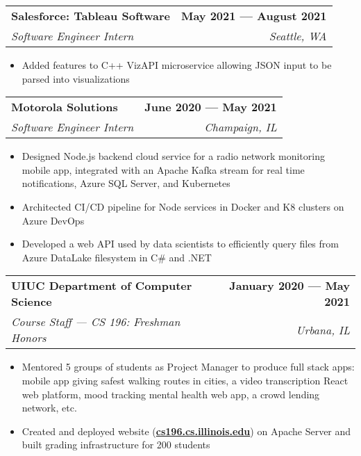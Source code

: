 \documentclass[letterpaper,11pt]{article}
\makeatletter
\newcommand{\resumeItem}[1]{
  \item\small{
    {#1 \vspace{-1pt}}
  }
}
\newcommand{\resumeSubheading}[4]{
  \vspace{-0pt}
  \item
    \begin{tabular*}{1\textwidth}[t]{l@{\extracolsep{\fill}}r}
      \large{\textbf{#1}} & \small{\color{main}\textbf{#2}} \\
      \textit{\small#3} & \textit{\small#4} \\
    \end{tabular*}\vspace{-7pt}
}
\newcommand{\resumeSubSubheading}[2]{
    \item
    \begin{tabular*}{0.97\textwidth}{l@{\extracolsep{\fill}}r}
      \textit{\small#1} & \textit{\small #2} \\
    \end{tabular*}\vspace{-7pt}
}
\newcommand{\resumeSubHeadingListEnd}{\end{itemize}}
\newcommand{\resumeItemListStart}{\begin{itemize}}
\newcommand{\resumeItemListEnd}{\end{itemize}\vspace{0pt}}
\makeatother
\begin{document}
    \resumeSubheading
      {Salesforce: Tableau Software} %
      {May 2021 --- August 2021} %
      {Software Engineer Intern} %
      {Seattle, WA} %
      \resumeItemListStart
        \resumeItem{Added features to C++ VizAPI microservice allowing JSON input to be parsed into visualizations}
      \resumeItemListEnd
      

    \resumeSubheading
      {Motorola Solutions} %
      {June 2020 --- May 2021} %
      {Software Engineer Intern} %
      {Champaign, IL} %
      \resumeItemListStart
        \resumeItem{Designed Node.js backend cloud service for a radio network monitoring mobile app, integrated with an Apache Kafka stream for real time notifications, Azure SQL Server, and Kubernetes }
        \resumeItem{Architected CI/CD pipeline for Node services in Docker and K8 clusters on Azure DevOps}
        \resumeItem{Developed a web API used by data scientists to efficiently query files from Azure DataLake filesystem in C\# and .NET}
    \resumeItemListEnd

    \resumeSubheading
      {UIUC Department of Computer Science} %
      {January 2020 --- May 2021} %
      {Course Staff --- CS 196: Freshman Honors} %
      {Urbana, IL} %
      \resumeItemListStart
        \resumeItem{Mentored 5 groups of students as Project Manager to produce full stack apps: mobile app giving safest walking routes in cities, a video transcription React web platform, mood tracking mental health web app, a crowd lending network, etc. }
        \resumeItem{Created and deployed website (\textbf{\href{https://cs196.cs.illinois.edu}{cs196.cs.illinois.edu}}) on Apache Server and built grading infrastructure for 200 students}
      \resumeItemListEnd
\end{document}
